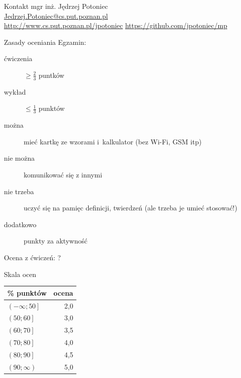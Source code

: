 \documentclass{mp}
\subtitle{Uwagi organizacyjne}
\begin{document}
\begin{frame}
\titlepage
\end{frame}
\begin{frame}{Kontakt}
mgr inż. Jędrzej Potoniec \\
\url{Jedrzej.Potoniec@cs.put.poznan.pl}\\
\url{http://www.cs.put.poznan.pl/jpotoniec}
\url{https://github.com/jpotoniec/mp}
\end{frame}
\begin{frame}{Zasady oceniania}
Egzamin:
\begin{description}
	\item[ćwiczenia] $\geq \frac{2}{3}$ puntków
	\item[wykład] $\leq \frac{1}{3}$ punktów
	\item[można] mieć kartkę ze wzorami i~kalkulator (bez Wi-Fi, GSM itp)
	\item[nie można] komunikować się z innymi
	\item[nie trzeba] uczyć się na pamięc definicji, twierdzeń (ale trzeba je umieć stosować!)
	\item[dodatkowo] punkty za aktywność
\end{description}

Ocena z ćwiczeń: \alert{?}
\end{frame}
\begin{frame}{Skala ocen}
\begin{center}
\begin{tabular}{l|r}
\% punktów & ocena \\
\hline
$\left(-\infty; 50\right]$ & 2,0 \\
$\left(50; 60\right]$ & 3,0 \\
$\left(60; 70\right]$ & 3,5 \\
$\left(70; 80\right]$ & 4,0 \\
$\left(80; 90\right]$ & 4,5 \\
$\left(90; \infty\right)$ & 5,0 \\
\end{tabular}
\end{center}
\end{frame}
\end{document}
